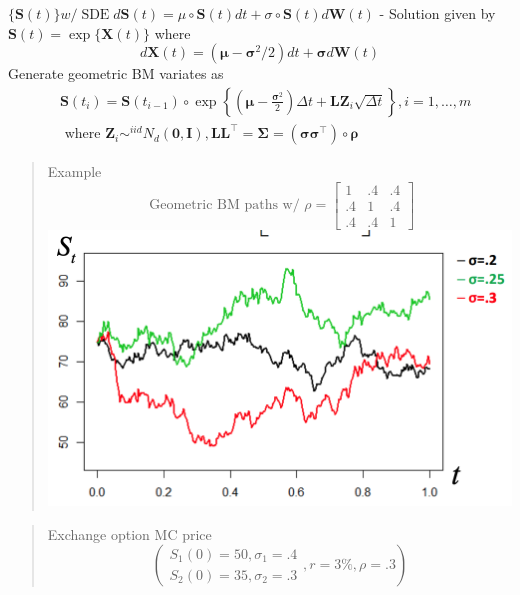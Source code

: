 \documentclass[
  oneside]{book}
\begin{document}
\(\{\mathbf{S}(t)\} w / \operatorname{SDE} d \mathbf{S}(t)=\mu \circ \mathbf{S}(t) d t+\sigma \circ \mathbf{S}(t) d \mathbf{W}(t)\)
- Solution given by \(\mathbf{S}(t)=\exp \{\mathbf{X}(t)\}\) where
\[
d \mathbf{X}(t)=\left(\boldsymbol{\mu}-\boldsymbol{\sigma}^2 / 2\right) d t+\boldsymbol{\sigma} d \mathbf{W}(t)
\]
Generate geometric BM variates as
\[
\begin{aligned}
& \mathbf{S}\left(t_i\right)=\mathbf{S}\left(t_{i-1}\right) \circ \exp \left\{\left(\boldsymbol{\mu}-\frac{\boldsymbol{\sigma}^2}{2}\right) \Delta t+\mathbf{L} \mathbf{Z}_i \sqrt{\Delta t}\right\}, i=1, \ldots, m \\
& \text { where } \mathbf{Z}_i \sim^{i i d} N_d(\mathbf{0}, \mathbf{I}), \mathbf{L} \mathbf{L}^{\top}=\mathbf{\Sigma}=\left(\boldsymbol{\sigma} \boldsymbol{\sigma}^{\top}\right) \circ \mathbf{\rho}
\end{aligned}
\]

\begin{quote}
Example
\[
\text { Geometric BM paths w/ } \rho=\left[\begin{array}{ccc}
1 & .4 & .4 \\
.4 & 1 & .4 \\
.4 & .4 & 1
\end{array}\right]
\]
\includegraphics{Notes/Obsidian-Attachments/10-Simulation-1.png}
\end{quote}

\begin{quote}
Exchange option MC price
\[
\left(\begin{array}{l}
S_1(0)=50, \sigma_1=.4 \\
S_2(0)=35, \sigma_2=.3
\end{array}, r=3 \%, \rho=.3\right)
\]
\end{quote}
\end{document}
